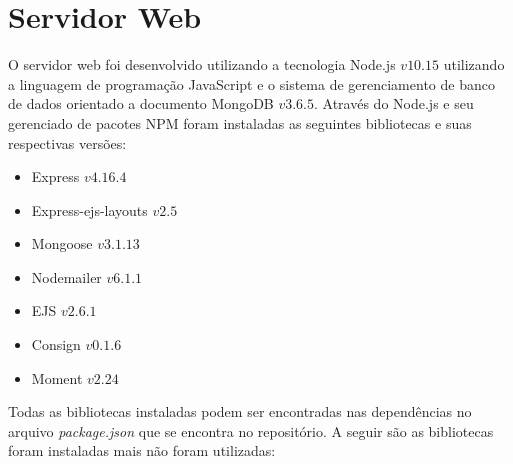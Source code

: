 \section{Servidor Web}

O servidor web foi desenvolvido utilizando a tecnologia Node.js $v10.15$ utilizando a linguagem de programação JavaScript e o sistema de gerenciamento de banco de dados orientado a documento MongoDB $v3.6.5$. Através do Node.js e seu gerenciado de pacotes NPM foram instaladas as seguintes bibliotecas e suas respectivas versões:

\begin{itemize}
    \item Express $v4.16.4$
    \item Express-ejs-layouts $v2.5$
    \item Mongoose $v3.1.13$
    \item Nodemailer $v6.1.1$
    \item EJS $v2.6.1$
    \item Consign $v0.1.6$
    \item Moment $v2.24$
\end{itemize}
\par
Todas as bibliotecas instaladas podem ser encontradas nas dependências no arquivo \textit{package.json} que se encontra no repositório. A seguir são as bibliotecas foram instaladas mais não foram utilizadas:

